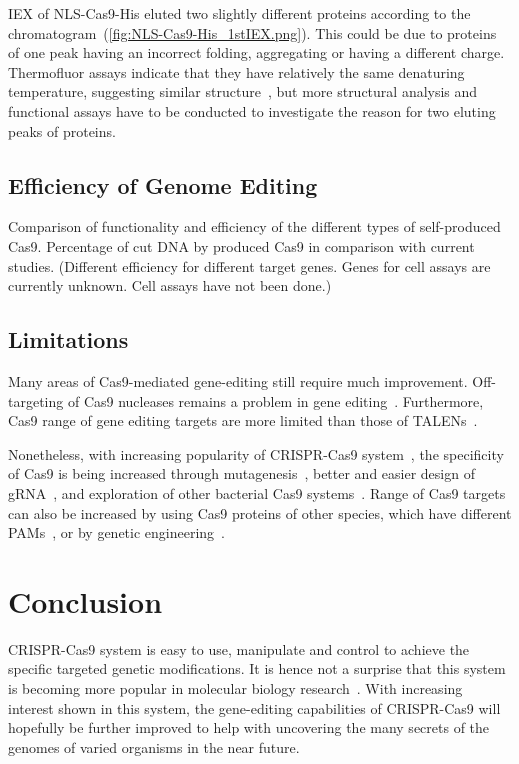 \documentclass[11pt]{article}
\begin{document}
IEX of NLS-Cas9-His eluted two slightly different proteins according to the chromatogram~(\autoref{fig:NLS-Cas9-His_1stIEX.png}). This could be due to proteins of one peak having an incorrect folding, aggregating or having a different charge. Thermofluor assays indicate that they have relatively the same denaturing temperature, suggesting similar structure~\citep{Ericsson2006}, but more structural analysis and functional assays have to be conducted to investigate the reason for two eluting peaks of proteins.

\subsection{Efficiency of Genome Editing}
Comparison of functionality and efficiency of the different types of self-produced Cas9. Percentage of cut DNA by produced Cas9 in comparison with current studies. (Different efficiency for different target genes. Genes for cell assays are currently unknown. Cell assays have not been done.)

\subsection{Limitations}
Many areas of Cas9-mediated gene-editing still require much improvement. Off-targeting of Cas9 nucleases remains a problem in gene editing~\citep{Cho2014a,Fu2013a,Wu2014b,Mali2013a}. Furthermore, Cas9 range of gene editing targets are more limited than those of TALENs~\citep{Gilles2014,Guilinger2014a}. 

Nonetheless, with increasing popularity of CRISPR-Cas9 system~\citep{Kaur2015}, the specificity of Cas9 is being increased through mutagenesis~\citep{Kleinstiver2016}, better and easier design of gRNA~\citep{Stemmer2015}, and exploration of other bacterial Cas9 systems~\citep{Esvelt2013a}. Range of Cas9 targets can also be increased by using Cas9 proteins of other species, which have different PAMs~\citep{Hou2013a}, or by genetic engineering~\citep{Kleinstiver2015}.


\section{Conclusion}
CRISPR-Cas9 system is easy to use, manipulate and control to achieve the specific targeted genetic modifications. It is hence not a surprise that this system is becoming more popular in molecular biology research~\citep{Sternberg2015}. With increasing interest shown in this system, the gene-editing capabilities of CRISPR-Cas9 will hopefully be further improved to help with uncovering the many secrets of the genomes of varied organisms in the near future. 
\end{document}

